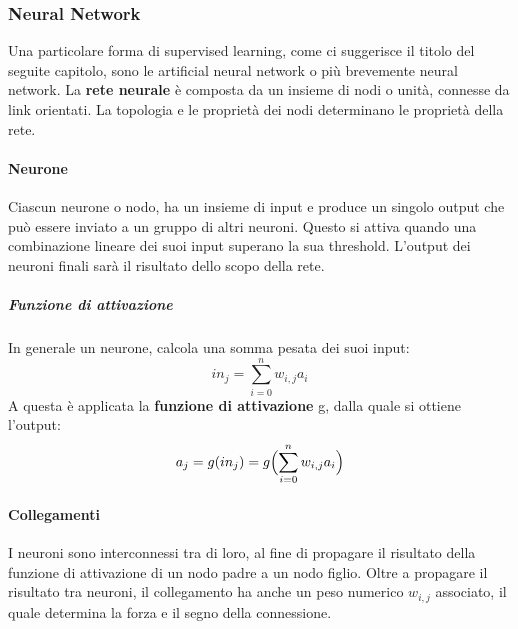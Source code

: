 \documentclass[14pt]{extarticle}
\begin{document}
\subsubsection{Neural Network}
Una particolare forma di supervised learning, come ci suggerisce il titolo del seguite capitolo, sono le artificial neural network o più brevemente neural network. 
La \textbf{rete neurale} è composta da un insieme di nodi o unità, connesse da link orientati.\cite{russell2005intelligenza}
 La topologia e le proprietà dei nodi determinano le proprietà della rete.
\paragraph{Neurone}
Ciascun neurone o nodo, ha un insieme di input e produce un singolo output che può essere inviato a un gruppo di altri neuroni. Questo si attiva quando una combinazione lineare dei suoi input superano la sua threshold. L'output dei neuroni finali sarà il risultato dello scopo della rete.
\subparagraph{Funzione di attivazione}
In generale un neurone, calcola una somma pesata dei suoi input:
\[in_j=\sum_{i=0}^n  w_{i,j}a_{i}\]
A questa è applicata la \textbf{funzione di attivazione} g, dalla quale si ottiene l'output:
\[a_j=g(in_j)=g \Bigl (\sum_{i=0}^n  w_{i,j}a_{i} \Bigr )\]

\paragraph{Collegamenti}
I neuroni sono interconnessi tra di  loro,  al fine di  propagare il risultato della funzione di attivazione di un nodo padre a un nodo figlio.
Oltre a propagare il risultato tra neuroni, il collegamento ha anche un peso numerico $w_{i,j}$ associato, il quale determina la forza e il segno della connessione.
\end{document}
